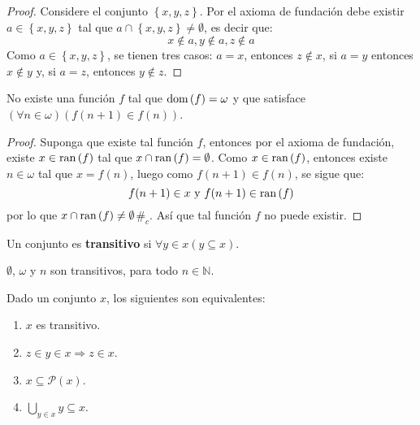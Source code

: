 \documentclass[12pt]{report}
\newcounter{it}
\theoremstyle{largebreak}
\newcommand\contradiction{\ensuremath{\#_c}}
\newcommand\pot[1]{\ensuremath{\mathcal{P}\left(#1\right)}}
\newcommand\dom[1]{\ensuremath{\textup{dom}\left(#1\right)}}
\newcommand\ran[1]{\ensuremath{\textup{ran}\left(#1\right)}}
\begin{document}
    \begin{proof}
        Considere el conjunto $\left\{x,y,z\right\}$. Por el axioma de fundación debe existir $a\in\left\{x,y,z\right\}$ tal que $a\cap\left\{x,y,z \right\}\neq\emptyset$, es decir que:
        \begin{equation*}
            x\notin a,y\notin a,z\notin a
        \end{equation*}
        Como $a\in\left\{x,y,z\right\}$, se tienen tres casos: $a=x$, entonces $z\notin x$, si $a=y$ entonces $x\notin y$ y, si $a=z$, entonces $y\notin z$.
    \end{proof}

    \begin{propo}
        No existe una función $f$ tal que $\dom{f}=\omega$ y que satisface $(\forall n\in\omega)(f(n+1)\in f(n))$.
    \end{propo}

    \begin{proof}
        Suponga que existe tal función $f$, entonces por el axioma de fundación, existe $x\in\ran{f}$ tal que $x\cap\ran{f}=\emptyset$. Como $x\in\ran{f}$, entonces existe $n\in\omega$ tal que $x=f(n)$, luego como $f(n+1)\in f(n)$, se sigue que:
        \begin{equation*}
            f(n+1)\in x\textup{ y }f(n+1)\in\ran{f}
        \end{equation*}
        por lo que $x\cap\ran{f}\neq\emptyset$\contradiction. Así que tal función $f$ no puede existir.
    \end{proof}

    \begin{mydef}
        Un conjunto es \textbf{transitivo} si $\forall y\in x(y\subseteq x)$.
    \end{mydef}

    \begin{exa}
        $\emptyset$, $\omega$ y $n$ son transitivos, para todo $n\in\mathbb{N}$.
    \end{exa}

    \begin{propo}
        Dado un conjunto $x$, los siguientes son equivalentes:
        \begin{enumerate}[label = \textit{(\arabic*)}]
            \item $x$ es transitivo.
            \item $z\in y\in x \Rightarrow z\in x$.
            \item $x\subseteq\pot{x}$.
            \item $\bigcup_{y\in x}y\subseteq x$.
        \end{enumerate}
    \end{propo}
\end{document}
